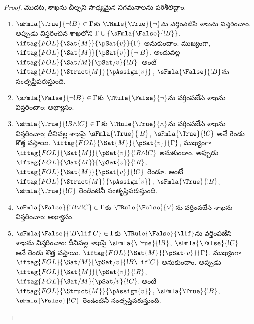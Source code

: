 \documentclass[../../../include/open-logic-section]{subfiles}
\begin{document}
\begin{proof}
మొదట, శాఖను చీల్చని సాధ్యమైన నిగమనాలను పరిశీలిద్దాం.
\begin{enumerate}
\item $\sFmla{\True}{\lnot !B} \in \Gamma$కు
  $\TRule{\True}{\lnot}$ను వర్తింపజేసి శాఖను విస్తరించాం. అప్పుడు
  విస్తరించిన శాఖలోని  $\Gamma \cup
  \{\sFmla{\False}{!B}\}$. $\iftag{FOL}{\Sat{M}}{\pSat{v}}{\Gamma}$
  అనుకుందాం. ముఖ్యంగా,
  $\iftag{FOL}{\Sat{M}}{\pSat{v}}{\lnot !B}$. అందువల్ల
  $\iftag{FOL}{\Sat/{M}}{\pSat/{v}}{!B}$; అంటే
  $\iftag{FOL}{\Struct{M}}{\pAssign{v}}$, $\sFmla{\False}{!B}$ను
  సంతృప్తిపరుస్తుంది.
\item $\sFmla{\False}{\lnot !B} \in \Gamma$కు
  $\TRule{\False}{\lnot}$ను వర్తింపజేసి శాఖను విస్తరించాం: అభ్యాసం.
\item $\sFmla{\True}{!B \land !C} \in \Gamma$కు
  $\TRule{\True}{\land}$ను వర్తింపజేసి శాఖను విస్తరించాం; దీనివల్ల
  శాఖపై $\sFmla{\True}{!B}$, $\sFmla{\True}{!C}$ అనే రెండు కొత్త
   వస్తాయి. $\iftag{FOL}{\Sat{M}}{\pSat{v}}{\Gamma}$,
  ముఖ్యంగా $\iftag{FOL}{\Sat{M}}{\pSat{v}}{!B \land !C}$ అనుకుందాం.
  అప్పుడు $\iftag{FOL}{\Sat{M}}{\pSat{v}}{!B}$,
  $\iftag{FOL}{\Sat{M}}{\pSat{v}}{!C}$ రెండూ. అంటే
  $\iftag{FOL}{\Struct{M}}{\pAssign{v}}$, $\sFmla{\True}{!B}$,
  $\sFmla{\True}{!C}$ రెండింటినీ సంతృప్తిపరుస్తుంది.
\item $\sFmla{\False}{!B \lor !C} \in \Gamma$కు
  $\TRule{\False}{\lor}$ను వర్తింపజేసి శాఖను విస్తరించాం: అభ్యాసం.
\item $\sFmla{\False}{!B \lif !C} \in \Gamma$కు
  $\TRule{\False}{\lif}$ను వర్తింపజేసి శాఖను విస్తరించాం: దీనివల్ల
  శాఖపై $\sFmla{\True}{!B}$, $\sFmla{\False}{!C}$ అనే రెండు కొత్త
   వస్తాయి. $\iftag{FOL}{\Sat{M}}{\pSat{v}}{\Gamma}$,
  ముఖ్యంగా $\iftag{FOL}{\Sat/{M}}{\pSat/{v}}{!B \lif !C}$ అనుకుందాం.
  అప్పుడు $\iftag{FOL}{\Sat{M}}{\pSat{v}}{!B}$,
  $\iftag{FOL}{\Sat/{M}}{\pSat/{v}}{!C}$. అంటే
  $\iftag{FOL}{\Struct{M}}{\pAssign{v}}$, $\sFmla{\True}{!B}$,
  $\sFmla{\False}{!C}$ రెండింటినీ సంతృప్తిపరుస్తుంది.

\end{enumerate}
\end{proof}
\end{document}
